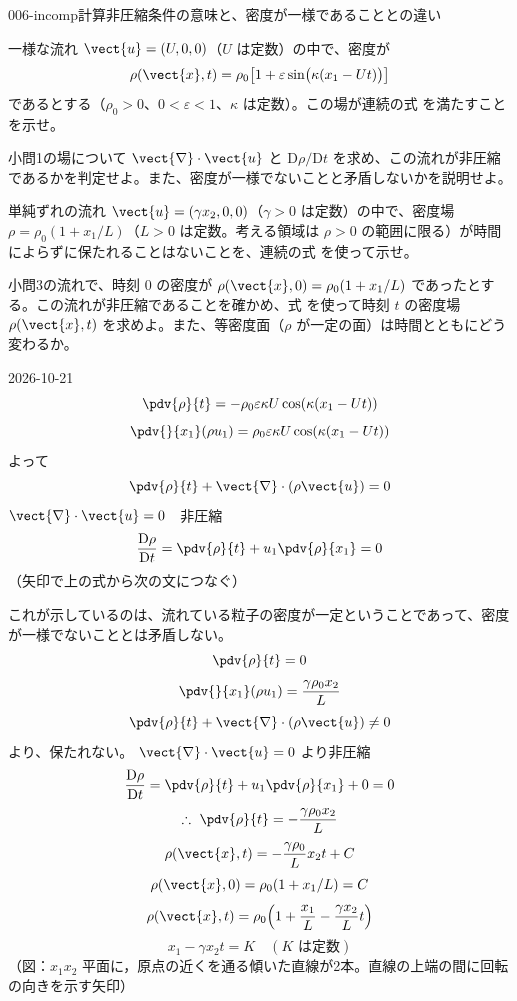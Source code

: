 \documentclass[uplatex,dvipdfmx,a4paper,11pt]{jsarticle}
\begin{document}
\begin{mondai}{006-incomp}{計算}{非圧縮条件の意味と、密度が一様であることとの違い}
\begin{shoumon}
    \item 一様な流れ $\vect{u} = (U, 0, 0)$（$U$ は定数）の中で、密度が
    \[ \rho(\vect{x},t) = \rho_0\bigl[1 + \varepsilon\sin\bigl(\kappa(x_1 - Ut)\bigr)\bigr] \]
    であるとする（$\rho_0>0$、$0<\varepsilon<1$、$\kappa$ は定数）。この場が連続の式  を満たすことを示せ。
    \item 小問1の場について $\vect{\nabla}\cdot\vect{u}$ と $\mathrm{D}\rho/\mathrm{D}t$ を求め、この流れが非圧縮であるかを判定せよ。また、密度が一様でないことと矛盾しないかを説明せよ。
    \item 単純ずれの流れ $\vect{u} = (\gamma x_2, 0, 0)$（$\gamma>0$ は定数）の中で、密度場 $\rho = \rho_0(1 + x_1/L)$（$L>0$ は定数。考える領域は $\rho>0$ の範囲に限る）が時間によらずに保たれることはないことを、連続の式  を使って示せ。
    \item 小問3の流れで、時刻 0 の密度が $\rho(\vect{x},0) = \rho_0(1 + x_1/L)$ であったとする。この流れが非圧縮であることを確かめ、式  を使って時刻 $t$ の密度場 $\rho(\vect{x},t)$ を求めよ。また、等密度面（$\rho$ が一定の面）は時間とともにどう変わるか。
  \end{shoumon}
\begin{kotaeutsushi}{2026-10-21}
\[ \pdv{\rho}{t}=-\rho_{0}\varepsilon\kappa U\cos(\kappa(x_{1}-Ut)) \]
\[ \pdv{}{x_{1}}(\rho u_{1})=\rho_{0}\varepsilon\kappa U\cos(\kappa(x_{1}-Ut)) \]
よって
\[ \pdv{\rho}{t}+\vect{\nabla}\cdot(\rho\vect{u})=0 \]
$\vect{\nabla}\cdot\vect{u}=0$　非圧縮
\[ \frac{\mathrm{D}\rho}{\mathrm{D}t}=\pdv{\rho}{t}+u_{1}\pdv{\rho}{x_{1}}=0 \]
（矢印で上の式から次の文につなぐ）

これが示しているのは、流れている粒子の密度が一定ということであって、密度が一様でないこととは矛盾しない。
\[ \pdv{\rho}{t}=0 \]
\[ \pdv{}{x_{1}}(\rho u_{1})=\frac{\gamma\rho_{0}x_{2}}{L} \]
\[ \pdv{\rho}{t}+\vect{\nabla}\cdot(\rho\vect{u})\neq0 \]
より、保たれない。
$\vect{\nabla}\cdot\vect{u}=0$ より非圧縮
\[ \frac{\mathrm{D}\rho}{\mathrm{D}t}=\pdv{\rho}{t}+u_{1}\pdv{\rho}{x_{1}}+0=0 \]
\[ \therefore\ \pdv{\rho}{t}=-\frac{\gamma\rho_{0}x_{2}}{L} \]
\[ \rho(\vect{x},t)=-\frac{\gamma\rho_{0}}{L}x_{2}t+C \]
\[ \rho(\vect{x},0)=\rho_{0}(1+x_{1}/L)=C \]
\[ \rho(\vect{x},t)=\rho_{0}\Bigl(1+\frac{x_{1}}{L}-\frac{\gamma x_{2}}{L}t\Bigr) \]
\[ x_{1}-\gamma x_{2}t=K\quad (K\text{ は定数}) \]
（図：$x_{1}x_{2}$ 平面に，原点の近くを通る傾いた直線が2本。直線の上端の間に回転の向きを示す矢印）


\end{kotaeutsushi}
\end{mondai}
\end{document}
